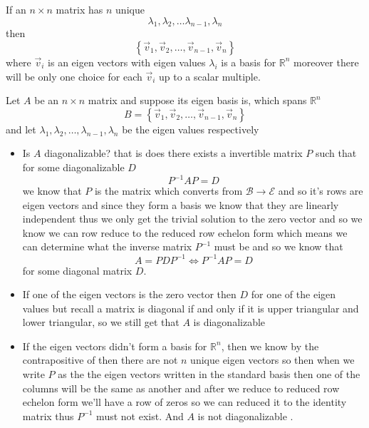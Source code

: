 \documentclass[11pt]{book}
\begin{document}
\begin{thm}\label{thm:n_distinct_eigen_values_}
    If an $n\times n$ matrix has $n$ unique 
    \[
    \lambda _{1},  \lambda _{2},  \dotsc   \lambda _{n - 1},  \lambda _{n}
    \]
    then 
    \[
    \left\{ \vec{v} _{1} , \vec{v} _{2} , \dotsc  , \vec{v} _{n - 1} , \vec{v} _{n}  \right\} 
    \]
    where $\vec{v} _{i} $ is an eigen vectors with eigen values $\lambda _{i} $ is a basis for $\mathbb{R} ^{n} $  
    moreover there will be only one choice for each $\vec{v} _{i} $ up to a scalar multiple.
\end{thm}

\begin{eg}
    Let $A$ be an $n\times n$ matrix and suppose its eigen basis is, which spans $\mathbb{R} ^{n} $ 
    \[
    B= \left\{ \vec{v} _{1} , \vec{v} _{2} , \dotsc  , \vec{v} _{n - 1} , \vec{v} _{n}  \right\} 
    \]
    and let $\lambda _{1} , \lambda _{2} , \dotsc  , \lambda _{n - 1} , \lambda _{n} $ be the eigen values respectively 
    \begin{itemize}
        \item Is $A$ diagonalizable? that is does there exists a invertible matrix $P$ such that for some diagonalizable $D$ 
            \[
            P^{-1} AP= D
            \]
            we know that $P$ is the matrix which converts from $\mathcal{B} \to \mathcal{E} $ and so it's rows are eigen vectors and since they form a basis we know that they are linearly independent thus we only get the trivial solution to the zero vector and so we know we can row reduce to the reduced row echelon form which means we can determine what the inverse matrix $P^{-1} $ must be and so we know that 
            \[
            A = PDP^{-1} \Leftrightarrow P^{-1} AP = D 
            \]
            for some diagonal matrix $D$. 
        \item If one of the eigen vectors is the zero vector then $D$ for one of the eigen values but recall a matrix is diagonal if and only if it is upper triangular and lower triangular, so we still get that $A$ is diagonalizable 
        \item If the eigen vectors didn't form a basis for $\mathbb{R} ^{n} $, then we know by the contrapositive of then there are not $n$ unique eigen vectors so then when we write $P$ as the the eigen vectors written in the standard basis then one of the columns will be the same as another and after we reduce to reduced row echelon form we'll have a row of zeros so we can reduced it to the identity matrix thus $P^{-1} $ must not exist. And $A$ is not diagonalizable .
    \end{itemize}
\end{eg}
\end{document}
